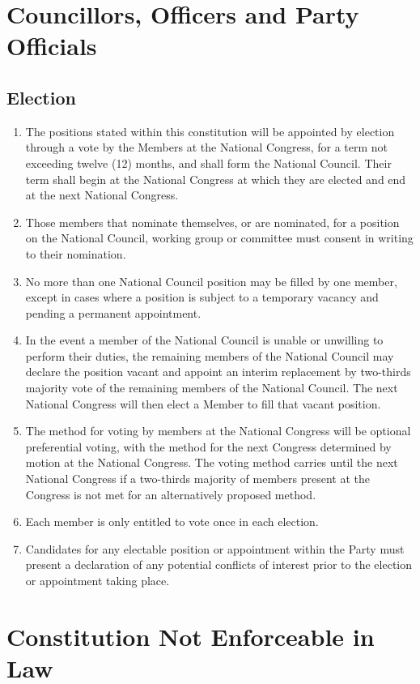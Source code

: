 \documentclass[a4paper,titlepage,8.5pt]{article}
\begin{document}
\section{Councillors, Officers and Party Officials}

\subsection{Election}

\begin{enumerate}
\item The positions stated within this constitution will be appointed by election through a vote by the Members at the National Congress, for a term not exceeding twelve (12) months, and shall form the National Council. Their term shall begin at the National Congress at which they are elected and end at the next National Congress.
\item Those members that nominate themselves, or are nominated, for a position on the National Council, working group or committee must consent in writing to their nomination.
\item No more than one National Council position may be filled by one member, except in cases where a position is subject to a temporary vacancy and pending a permanent appointment.
\item In the event a member of the National Council is unable or unwilling to perform their duties, the remaining members of the National Council may declare the position vacant and appoint an interim replacement by two-thirds majority vote of the remaining members of the National Council. The next National Congress will then elect a Member to fill that vacant position.
\item The method for voting by members at the National Congress will be optional preferential voting, with the method for the next Congress determined by motion at the National Congress. The voting method carries until the next National Congress if a two-thirds majority of members present at the Congress is not met for an alternatively proposed method.
\item Each member is only entitled to vote once in each election.
\item Candidates for any electable position or appointment within the Party must present a declaration of any potential conflicts of interest prior to the election or appointment taking place.
\end{enumerate}

\section{Constitution Not Enforceable in Law}
\end{document}
